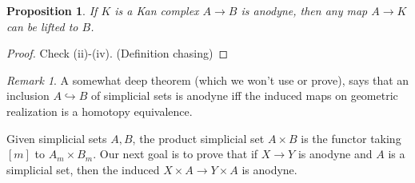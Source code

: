 \documentclass{article}
\theoremstyle{definition}
\theoremstyle{remark}
\newtheorem{rem}{Remark}
\theoremstyle{plain}
\newtheorem{prop}[defn]{Proposition}
\begin{document}
\begin{prop}
    If $K$ is a Kan complex $A\to B$ is anodyne, then any map $A\to K$ can be lifted to $B$.
\end{prop}
\begin{proof}
    Check (ii)-(iv). (Definition chasing)
\end{proof}
\begin{rem}
    A somewhat deep theorem (which we won't use or prove), says that an inclusion $A\hookrightarrow B$ of simplicial sets is anodyne iff the induced maps on geometric realization is a homotopy equivalence.
\end{rem}
Given simplicial sets $A, B$, the product simplicial set $A\times B$ is the functor taking $[m]$ to $A_m\times B_m$. Our next goal is to prove that if $X\to Y$ is anodyne and $A$ is a simplicial set, then the induced $X\times A\to Y\times A$ is anodyne.
\end{document}
